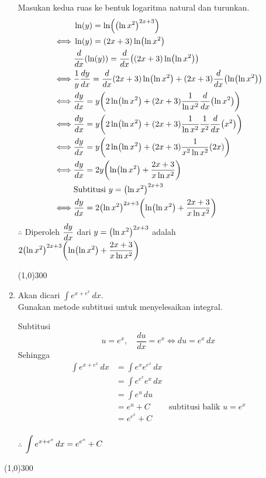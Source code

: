 \begin{enumerate}[leftmargin=*, label={\arabic*}.]
Masukan kedua ruas ke bentuk logaritma natural dan turunkan.
\begin{align*}
    &\ln(y) = \ln\brk*{\brk*{\ln x^{2}}^{2x+3}}\\
    \iff &\ln(y) = (2x+3)\ln\brk*{\ln x^{2}}\\
    &\drv{x}{\ln(y)} = \drv{x}{(2x+3)\ln\brk*{\ln x^{2}}}\\
    \iff &\frac{1}{y}\frac{dy}{dx} = 
    \drv{x}{2x+3}\ln\brk*{\ln x^{2}}+(2x+3)\drv{x}{\ln\brk*{\ln x^{2}}}\\
    \iff &\frac{dy}{dx} = y\brk*{2\ln\brk*{\ln x^{2}}
    +(2x+3)\frac{1}{\ln x^{2}}\drv{x}{\ln x^{2}}}\\
    \iff &\frac{dy}{dx} = y\brk*{2\ln\brk*{\ln x^{2}}
    +(2x+3)\frac{1}{\ln x^{2}}\frac{1}{x^{2}}\drv{x}{x^{2}}}\\
    \iff &\frac{dy}{dx} = y\brk*{2\ln\brk*{\ln x^{2}}
    +(2x+3)\frac{1}{x^{2}\ln x^{2}}(2x)}\\
    \iff &\frac{dy}{dx} = 2y\brk*{\ln\brk*{\ln x^{2}}+\frac{2x+3}{x\ln x^{2}}}\\
    &\text{Subtitusi $y=\brk*{\ln x^{2}}^{2x+3}$}\\
    \iff &\frac{dy}{dx} = 2\brk*{\ln x^{2}}^{2x+3}
    \brk*{\ln\brk*{\ln x^{2}}+\frac{2x+3}{x\ln x^{2}}}
\end{align*}
$\therefore$ Diperoleh $\ds \frac{dy}{dx}$ dari $y=\brk*{\ln x^{2}}^{2x+3}$ adalah 
$\ds 2\brk*{\ln x^{2}}^{2x+3}\brk*{\ln\brk*{\ln x^{2}}+\frac{2x+3}{x\ln x^{2}}}$
\begin{center}
    \line(1,0){300}
\end{center}
\item Akan dicari $\int e^{x+e^{x}}\,dx$.\\
Gunakan metode subtitusi untuk menyelesaikan integral.

Subtitusi
    \[
        u = e^{x},\quad \frac{du}{dx} = e^{x} \iff du = e^{x}\,dx
    \]
    Sehingga 
    \begin{align*}
        \int e^{x+e^{x}}\,dx
        &= \int e^{x}e^{e^{x}}\,dx\\
        &= \int e^{e^{x}}e^{x}\,dx\\
        &= \int e^{u}\,du\\
        &= e^{u} + C &\text{subtitusi balik $u = e^{x}$}\\
        &= e^{e^{x}} + C\\
    \end{align*}
    
    $\therefore$ $\ds \int e^{x+e^{x}}\,dx = e^{e^{x}} + C$
\end{enumerate}
\begin{center}
    \line(1,0){300}
\end{center}